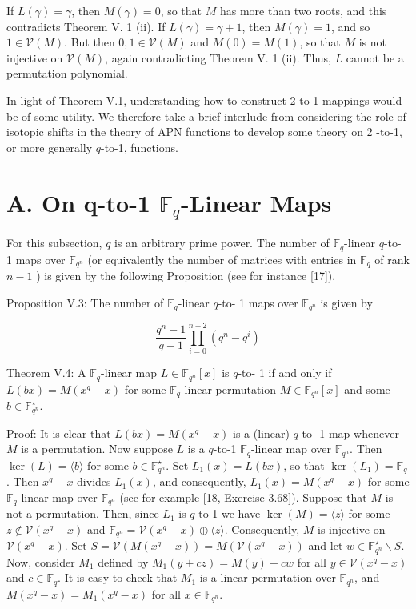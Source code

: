 \documentclass[10pt]{article}
\begin{document}
If $L(\gamma)=\gamma$, then $M(\gamma)=0$, so that $M$ has more than two roots, and this contradicts Theorem V. 1 (ii). If $L(\gamma)=\gamma+1$, then $M(\gamma)=1$, and so $1 \in \mathcal{V}(M)$. But then $0,1 \in \mathcal{V}(M)$ and $M(0)=M(1)$, so that $M$ is not injective on $\mathcal{V}(M)$, again contradicting Theorem V. 1 (ii). Thus, $L$ cannot be a permutation polynomial.

In light of Theorem V.1, understanding how to construct 2-to-1 mappings would be of some utility. We therefore take a brief interlude from considering the role of isotopic shifts in the theory of APN functions to develop some theory on 2 -to-1, or more generally $q$-to-1, functions.

\section*{A. On q-to-1 $\mathbb{F}_{q}$-Linear Maps}
For this subsection, $q$ is an arbitrary prime power. The number of $\mathbb{F}_{q}$-linear $q$-to- 1 maps over $\mathbb{F}_{q^{n}}$ (or equivalently the number of matrices with entries in $\mathbb{F}_{q}$ of rank $n-1$ ) is given by the following Proposition (see for instance [17]).

Proposition V.3: The number of $\mathbb{F}_{q}$-linear $q$-to- 1 maps over $\mathbb{F}_{q^{n}}$ is given by

$$
\frac{q^{n}-1}{q-1} \prod_{i=0}^{n-2}\left(q^{n}-q^{i}\right)
$$

Theorem V.4: A $\mathbb{F}_{q}$-linear map $L \in \mathbb{F}_{q^{n}}[x]$ is $q$-to- 1 if and only if $L(b x)=M\left(x^{q}-x\right)$ for some $\mathbb{F}_{q}$-linear permutation $M \in \mathbb{F}_{q^{n}}[x]$ and some $b \in \mathbb{F}_{q^{n}}^{\star}$.

Proof: It is clear that $L(b x)=M\left(x^{q}-x\right)$ is a (linear) $q$-to- 1 map whenever $M$ is a permutation. Now suppose $L$ is a $q$-to-1 $\mathbb{F}_{q}$-linear map over $\mathbb{F}_{q^{n}}$. Then $\operatorname{ker}(L)=\langle b\rangle$ for some $b \in \mathbb{F}_{q^{n}}^{\star}$. Set $L_{1}(x)=L(b x)$, so that $\operatorname{ker}\left(L_{1}\right)=\mathbb{F}_{q}$. Then $x^{q}-x$ divides $L_{1}(x)$, and consequently, $L_{1}(x)= M\left(x^{q}-x\right)$ for some $\mathbb{F}_{q}$-linear map over $\mathbb{F}_{q^{n}}$ (see for example [18, Exercise 3.68]). Suppose that $M$ is not a permutation. Then, since $L_{1}$ is $q$-to-1 we have $\operatorname{ker}(M)=\langle z\rangle$ for some $z \notin \mathcal{V}\left(x^{q}-x\right)$ and $\mathbb{F}_{q^{n}}=\mathcal{V}\left(x^{q}-x\right) \oplus\langle z\rangle$. Consequently, $M$ is injective on $\mathcal{V}\left(x^{q}-x\right)$. Set $S=\mathcal{V}\left(M\left(x^{q}-x\right)\right)= M\left(\mathcal{V}\left(x^{q}-x\right)\right)$ and let $w \in \mathbb{F}_{q^{n}}^{\star} \backslash S$. Now, consider $M_{1}$ defined by $M_{1}(y+c z)=M(y)+c w$ for all $y \in \mathcal{V}\left(x^{q}-x\right)$ and $c \in \mathbb{F}_{q}$. It is easy to check that $M_{1}$ is a linear permutation over $\mathbb{F}_{q^{n}}$, and $M\left(x^{q}-x\right)=M_{1}\left(x^{q}-x\right)$ for all $x \in \mathbb{F}_{q^{n}}$.
\end{document}
